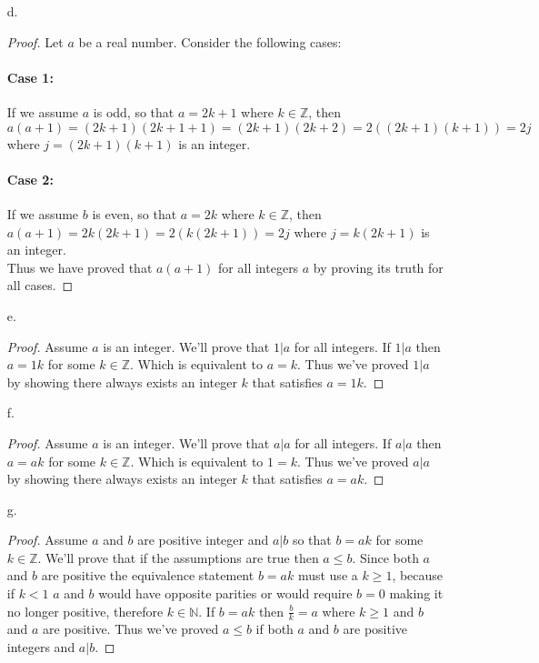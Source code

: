 \documentclass[11pt]{amsart}
\theoremstyle{definition}
\begin{document}
\begin{itemize}
\begin{itemize}
    \item[d.] \begin{proof}
        Let $a$ be a real number. Consider the following cases:
        \paragraph{Case 1:}
            If we assume $a$ is odd, so that $a=2k+1$ where $k\in\mathbb{Z}$, then $a(a+1)=(2k+1)(2k+1+1)=(2k+1)(2k+2)=2((2k+1)(k+1))=2j$ where $j=(2k+1)(k+1)$ is an integer.
        \paragraph{Case 2:}
            If we assume $b$ is even, so that $a=2k$ where $k\in\mathbb{Z}$, then $a(a+1)=2k(2k+1)=2(k(2k+1))=2j$ where $j=k(2k+1)$ is an integer. \\
        Thus we have proved that $a(a+1)$ for all integers $a$ by proving its truth for all cases.
    \end{proof}
    
    \item[e.] \begin{proof}
        Assume $a$ is an integer. We'll prove that $1|a$ for all integers. If $1|a$ then $a=1k$ for some $k\in\mathbb{Z}$. Which is equivalent to $a=k$. Thus we've proved $1|a$ by showing there always exists an integer $k$ that satisfies $a=1k$.
    \end{proof}

    \item[f.] \begin{proof}
        Assume $a$ is an integer. We'll prove that $a|a$ for all integers. If $a|a$ then $a=ak$ for some $k\in\mathbb{Z}$. Which is equivalent to $1=k$. Thus we've proved $a|a$ by showing there always exists an integer $k$ that satisfies $a=ak$.
    \end{proof}

    \item[g.] \begin{proof}
        Assume $a$ and $b$ are positive integer and $a|b$ so that $b=ak$ for some $k\in\mathbb{Z}$. We'll prove that if the assumptions are true then $a\le b$. Since both $a$ and $b$ are positive the equivalence statement $b=ak$ must use a $k\ge 1$, because if $k<1$ $a$ and $b$ would have opposite parities or would require $b=0$ making it no longer positive, therefore $k\in\mathbb{N}$. If $b=ak$ then $\frac bk=a$  where $k\ge 1$ and $b$ and $a$ are positive. Thus we've proved $a\le b$ if both $a$ and $b$ are positive integers and $a|b$.
    \end{proof}


\end{itemize}
\end{itemize}
\end{document}
